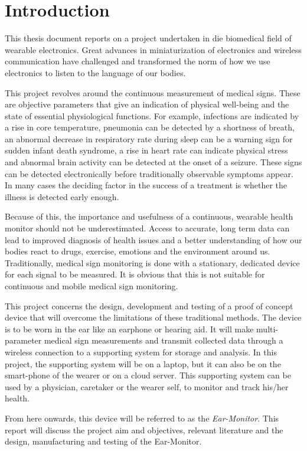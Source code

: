 \chapter{Introduction}
\label{chp:Introduction}
This thesis document reports on a project undertaken in die biomedical field of wearable electronics. Great advances in miniaturization of electronics and wireless communication have challenged and transformed the norm of how we use electronics to listen to the language of our bodies.

\medskip
This project revolves around the continuous measurement of medical signs. These are objective parameters that give an indication of physical well-being and the state of essential physiological functions. For example, infections are indicated by a rise in core temperature, pneumonia can be detected by a shortness of breath, an abnormal decrease in respiratory rate during sleep can be a warning sign for sudden infant death syndrome, a rise in heart rate can indicate physical stress and abnormal brain activity can be detected at the onset of a seizure. These signs can be detected electronically before traditionally observable symptoms appear. In many cases the deciding factor in the success of a treatment is whether the illness is detected early enough.

\medskip
Because of this, the importance and usefulness of a continuous, wearable health monitor should not be underestimated. Access to accurate, long term data can lead to improved diagnosis of health issues and a better understanding of how our bodies react to drugs, exercise, emotions and the environment around us. Traditionally, medical sign monitoring is done with a stationary, dedicated device for each signal to be measured. It is obvious that this is not suitable for continuous and mobile medical sign monitoring.

\medskip
This project concerns the design, development and testing of a proof of concept device that will overcome the limitations of these traditional methods. The device is to be worn in the ear like an earphone or hearing aid. It will make multi-parameter medical sign measurements and transmit collected data through a wireless connection to a supporting system for storage and analysis. In this project, the supporting system will be on a laptop, but it can also be on the smart-phone of the wearer or on a cloud server. This supporting system can be used by a physician, caretaker or the wearer self, to monitor and track his/her health.

\medskip
From here onwards, this device will be referred to as the \textit{Ear-Monitor}. This report will discuss the project aim and objectives, relevant literature and the design, manufacturing and testing of the Ear-Monitor.

